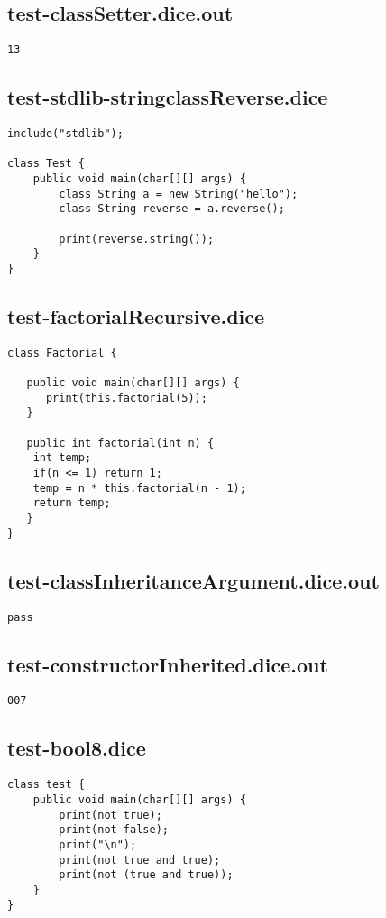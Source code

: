 \subsection{test-classSetter.dice.out}
\begin{verbatim}
13
\end{verbatim}
\pagebreak
\subsection{test-stdlib-stringclassReverse.dice}
\begin{verbatim}
include("stdlib");

class Test {
    public void main(char[][] args) {
        class String a = new String("hello");
        class String reverse = a.reverse();

        print(reverse.string());
    }   
}

\end{verbatim}
\pagebreak
\subsection{test-factorialRecursive.dice}
\begin{verbatim}
class Factorial {

   public void main(char[][] args) {
      print(this.factorial(5));
   }

   public int factorial(int n) {
    int temp;
    if(n <= 1) return 1;
    temp = n * this.factorial(n - 1);
    return temp;
   }
}

\end{verbatim}
\pagebreak
\subsection{test-classInheritanceArgument.dice.out}
\begin{verbatim}
pass
\end{verbatim}
\pagebreak
\subsection{test-constructorInherited.dice.out}
\begin{verbatim}
007
\end{verbatim}
\pagebreak
\subsection{test-bool8.dice}
\begin{verbatim}
class test {
	public void main(char[][] args) {
		print(not true);
		print(not false);
		print("\n");
		print(not true and true);
		print(not (true and true));
	}
}
\end{verbatim}
\pagebreak
